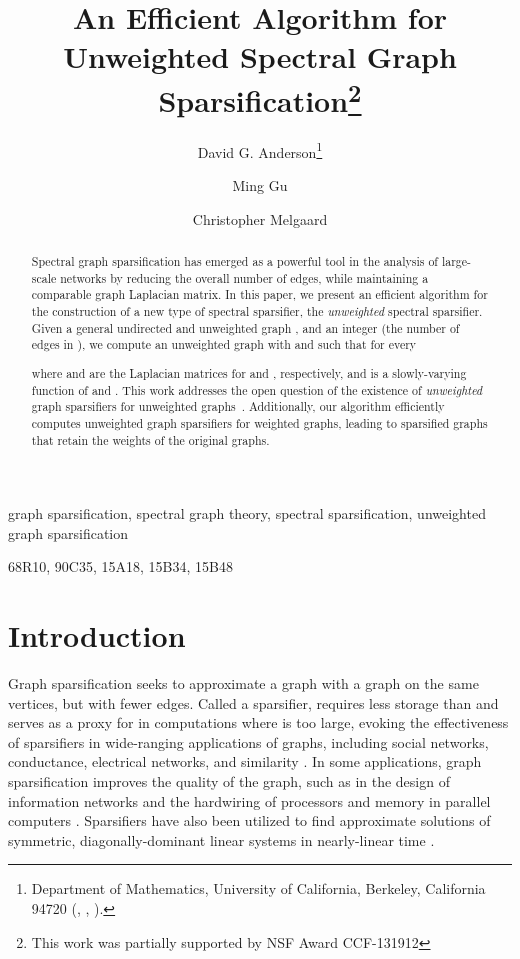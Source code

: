 \documentclass[final,leqno,onefignum,onetabnum]{siamltex1213}
\title{An Efficient Algorithm for Unweighted Spectral Graph Sparsification\thanks{This work was partially supported by NSF Award CCF-131912}}
\author{David G. Anderson\thanks{Department of Mathematics, University of California, Berkeley, California 94720 (\email{anderson@math.berkeley.edu}, \email{mgu@math.berkeley.edu}, \email{melgaard@math.berkeley.edu}).} \and Ming Gu\footnotemark[2] \and Christopher Melgaard\footnotemark[2]}
\begin{document}
\maketitle
{}

\begin{abstract}
Spectral graph sparsification has emerged as a powerful
tool in the analysis of large-scale networks by reducing the overall
number of edges, while maintaining a comparable graph Laplacian
matrix. In this paper, we present an efficient algorithm for the
construction of a new type of spectral sparsifier, the
\emph{unweighted} spectral sparsifier. Given a general undirected and unweighted
graph , and an integer  (the
number of edges in ), we compute an unweighted graph  with  and  such that for every  
 
where  and  are the Laplacian matrices for  and ,
respectively, and  is a slowly-varying
function of  and . This work addresses the
open question of the existence of \emph{unweighted} graph
sparsifiers for unweighted
graphs~\cite{ramanujansparse}.  Additionally, our algorithm efficiently computes
unweighted graph sparsifiers for weighted graphs, leading to
sparsified graphs that retain the weights of the original graphs.
\end{abstract}

\begin{keywords}graph sparsification, spectral graph theory, spectral sparsification, unweighted graph sparsification\end{keywords}

\begin{AMS} 68R10, 90C35, 15A18, 15B34, 15B48\end{AMS}


\pagestyle{myheadings}
\thispagestyle{plain}

\section{Introduction}

Graph sparsification seeks to approximate a graph  with a graph  on the same vertices, but with fewer edges.  Called a sparsifier,  requires less storage than  and serves as a proxy for  in computations where  is too large, evoking the effectiveness of sparsifiers in wide-ranging applications of graphs, including social networks, conductance, electrical networks, and similarity \cite{conf/soda/ChierichettiLP10,DBLP:conf/stoc/ChristianoKMST11,conf/kdd/MathioudakisBCGU11,st1}.  In some applications, graph sparsification improves the quality of the graph, such as in the design of information networks and the hardwiring of processors and memory in parallel computers \cite{journals/cacm/BatsonSST13,4495}.  Sparsifiers have also been utilized to find approximate solutions of symmetric, diagonally-dominant linear systems in nearly-linear time \cite{journals/cacm/BatsonSST13,journals/corr/cs-DS-0310036,st1,journals/corr/abs-cs-0607105}.
\end{document}
